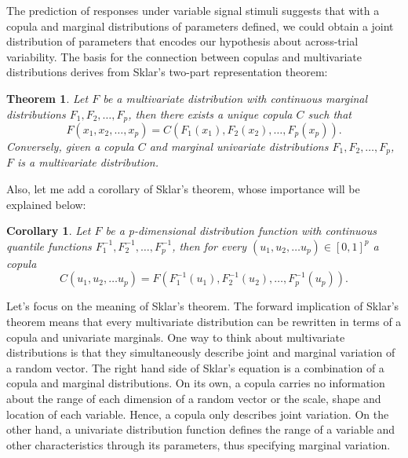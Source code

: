 \documentclass[12pt]{report}
\begin{document}
The prediction of responses under variable signal stimuli suggests that with a copula and marginal distributions of parameters defined, we could obtain a joint distribution of parameters that encodes our hypothesis about across-trial variability. The basis for the connection between copulas and multivariate distributions derives from Sklar's \citeyear{Skl1959} two-part representation
theorem:
%
\newtheorem*{Sklar}{Theorem} 
\begin{Sklar} 
Let $F$ be a multivariate distribution with continuous marginal
distributions $F_1, F_2, \dots, F_p$, then there exists a unique
copula $C$ such that 
%
\begin{equation}
\label{eqn:sklar}
F(x_1, x_2, \dots, x_p) = C(F_1(x_1), F_2(x_2),
\dots, F_p(x_p)).
\end{equation}
%
Conversely, given a copula $C$ and marginal univariate distributions $F_1,
F_2, \dots, F_p$, $F$ is a multivariate distribution.
\end{Sklar}

Also, let me add a corollary of Sklar's theorem, whose importance will be explained below:
%
\newtheorem{cors}{Corollary}
\begin{cors}
\label{thm:copula}
Let $F$ be a p-dimensional distribution function with continuous
quantile functions $F_1^{-1}, F_2^{-1}, \dots, F_p^{-1}$, then for
every $(u_1, u_2, \dots u_p) \in [0, 1]^p$ a copula
%
\begin{equation}
\label{eqn:copula}
C(u_1, u_2, \dots u_p) = F(F_1^{-1}(u_1), F_2^{-1}(u_2), \dots, F_p^{-1}(u_p)).
\end{equation}
%
\end{cors}
%

Let's focus on the meaning of Sklar's theorem. The forward implication of Sklar's theorem means that every multivariate distribution can be rewritten in terms of a copula and univariate marginals. One way to think about multivariate distributions is that they simultaneously describe joint and marginal variation of a random vector. The right hand side of Sklar's equation is a combination of a copula and marginal distributions. On its own, a copula carries no information about the range of each dimension of a random vector or the scale, shape and location of each variable. Hence, a copula only describes joint variation. On the other hand, a univariate distribution function defines the range of a variable and other characteristics through its parameters, thus specifying marginal variation.
\end{document}
